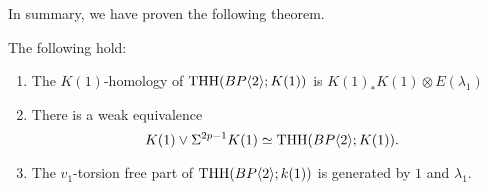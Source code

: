 In summary, we have proven the following theorem.
\begin{thm}\label{thm:K(1)coeff} The following hold:
	\begin{enumerate}
		\item The $K(1)$-homology of $\operatorname{THH}(BP\langle 2 \rangle;K(1))$ is $K(1)_*K(1)\otimes E(\lambda_1)$
		\item There is a weak equivalence
		\[ K(1)\vee \Sigma^{2p-1}K(1)\simeq \operatorname{THH}(BP\langle 2 \rangle;K(1)).\]
		\item The $v_1$-torsion free part of $\operatorname{THH}(BP\langle 2 \rangle;k(1))$ is generated by $1$ and $\lambda_1$.
	\end{enumerate}
\end{thm}
